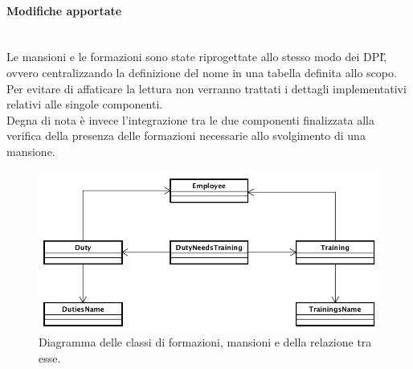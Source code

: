 \paragraph*{Modifiche apportate} \mbox{} \\
Le mansioni e le formazioni sono state riprogettate allo stesso modo dei \gls{DPI}\G, ovvero centralizzando la definizione del nome in una tabella definita allo scopo. \\
Per evitare di affaticare la lettura non verranno trattati i dettagli implementativi relativi alle singole componenti. \\
Degna di nota è invece l'integrazione tra le due componenti finalizzata alla verifica della presenza delle formazioni necessarie allo svolgimento di una mansione. \\

\begin{figure}[H]
	\begin{center}
		\includegraphics[width=12cm]{Pics/UMLClassiFormazioniMansioni.png}
		\caption{Diagramma delle classi di formazioni, mansioni e della relazione tra esse.}
		\label{fig:UMLClassiFormazioniMansioni.png}
	\end{center}
\end{figure}

